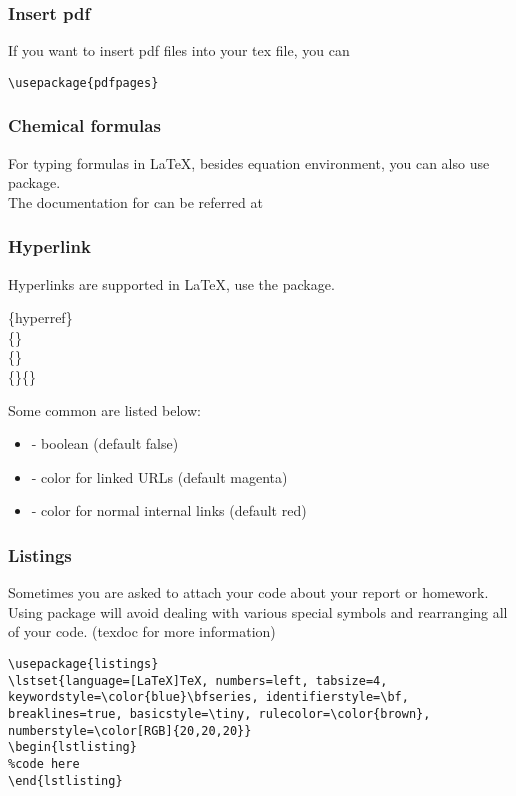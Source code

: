 \begin{frame}[fragile]
	\frametitle{Insert pdf}
	If you want to insert pdf files into your tex file, you can 
	\begin{command}
	\begin{verbatim}
\usepackage{pdfpages}

	\end{verbatim}
	\end{command}
\end{frame}

\begin{frame}
	\frametitle{Chemical formulas}
	For typing formulas in \LaTeX, besides equation environment, you can also use  package.
	\\The documentation for  can be referred at 
\end{frame}

\begin{frame}
	\frametitle{Hyperlink}
	Hyperlinks are supported in \LaTeX, use the  package.
	\begin{command}
		\{hyperref\}\\
		\{\}\\
		\{\}\\
		\{\}\{\}
	\end{command}
	Some common  are listed below: 
	\begin{itemize}
		\item {} - boolean (default false)
		\item {} - color for linked URLs (default magenta)
		\item {} - color for normal internal links (default red)
	\end{itemize}
\end{frame}

\begin{frame}[fragile]
	\frametitle{Listings}
	Sometimes you are asked to attach your code about your report or homework. Using  package will avoid dealing with various special symbols and rearranging all of your code. (\alert{texdoc}  for more information)
	\begin{example}
		\begin{verbatim}
\usepackage{listings}
\lstset{language=[LaTeX]TeX, numbers=left, tabsize=4, keywordstyle=\color{blue}\bfseries, identifierstyle=\bf, breaklines=true, basicstyle=\tiny, rulecolor=\color{brown}, numberstyle=\color[RGB]{20,20,20}}
\begin{lstlisting}
%code here
\end{lstlisting}
		\end{verbatim}
	\end{example} 
\end{frame}	

